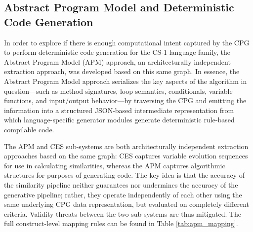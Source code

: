 \subsection{Abstract Program Model and Deterministic Code Generation}
\label{subsec:apm}
In order to explore if there is enough computational intent captured by the CPG to perform deterministic code generation for the CS-1 language family, the Abstract Program Model (APM) approach, an architecturally independent extraction approach, was developed based on this same graph. In essence, the Abstract Program Model approach serializes the key aspects of the algorithm in question---such as method signatures, loop semantics, conditionals, variable functions, and input/output behavior---by traversing the CPG and emitting the information into a structured JSON-based intermediate representation from which language-specific generator modules generate deterministic rule-based compilable code.

The APM and CES sub-systems are both architecturally independent extraction approaches based on the same graph: CES captures variable evolution sequences for use in calculating similarities, whereas the APM captures algorithmic structures for purposes of generating code. The key idea is that the accuracy of the similarity pipeline neither guarantees nor undermines the accuracy of the generative pipeline; rather, they operate independently of each other using the same underlying CPG data representation, but evaluated on completely different criteria. Validity threats between the two sub-systems are thus mitigated. The full construct-level mapping rules can be found in Table \ref{tab:apm_mapping}.

